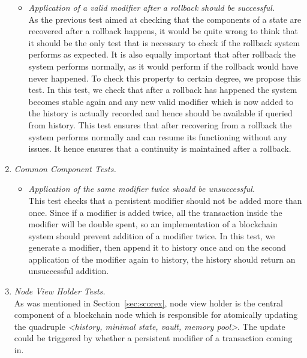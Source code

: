 \begin{enumerate}[\IEEEsetlabelwidth{Z}]
\begin{itemize}[]
\item \textit{Application of a valid modifier after a rollback should be successful.}\\
As the previous test aimed at checking that the components of a state are recovered after a rollback happens, it would be quite wrong to think that it should be the only test that is necessary to check if the rollback system performs as expected. It is also equally important that after rollback the system performs normally, as it would perform if the rollback would have never happened. To check this property to certain degree, we propose this test. In this test, we check that after a rollback has happened the system becomes stable again and any new valid modifier which is now added to the history is actually recorded and hence should be available if queried from history. This test ensures that after recovering from a rollback the system performs normally and can resume its functioning without any issues. It hence ensures that a continuity is maintained after a rollback.
\end{itemize}

\item \textit{Common Component Tests.}\\
\begin{itemize}[]

\item \textit{Application of the same modifier twice should be unsuccessful.}\\
This test checks that a persistent modifier should not be added more than once. Since if a modifier is added twice, all the transaction inside the modifier will be double spent, so an implementation of a blockchain system should prevent addition of a modifier twice. In this test, we generate a modifier, then append it to history once and on the second application of the modifier again to history, the history should return an unsuccessful addition.
\end{itemize}

\item \textit{Node View Holder Tests.}\\

As was mentioned in Section~\ref{sec:scorex}, node view holder is the central component of a blockchain node which is responsible for atomically updating the quadruple \textit{<history, minimal state, vault, memory pool>}. The update could be triggered by whether a persistent modifier of a transaction coming in. 



\end{enumerate}
